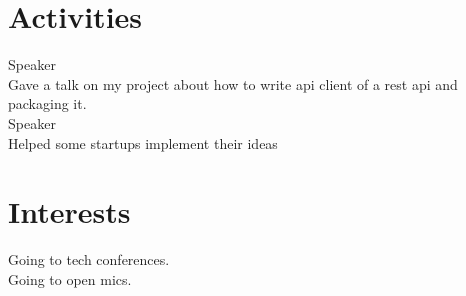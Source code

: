 \documentclass[]{deedy-resume-openfont}
\begin{document}
\begin{minipage}[t]{0.33\textwidth}
\section{Activities}
\textbullet{} Speaker \\
\textbullet{} Gave a talk on my project about how to write api client of a rest api and packaging it. \\
\textbullet{} Speaker \\
\textbullet{} Helped some startups implement their ideas \\
\sectionsep
%
%

\section{Interests}
\textbullet{} Going to tech conferences. \\
\textbullet{} Going to open mics. \\

%
%

\end{minipage}
\hfill
\end{document}

